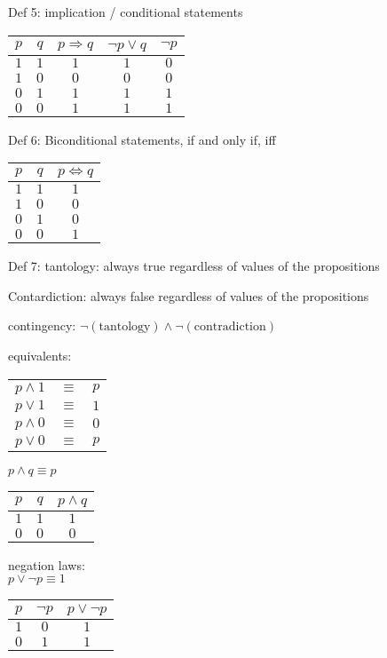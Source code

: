 \documentclass{article}
\begin{document}
Def 5: implication / conditional statements \\
\begin{tabular}{cc|c||c||c}
  $p$ & $q$ & $p \Rightarrow q$ & $\neg p \vee q$ & $\neg p$ \\ \hline
  $1$ & $1$ & $1$ & $1$ & $0$ \\
  $1$ & $0$ & $0$ & $0$ & $0$ \\
  $0$ & $1$ & $1$ & $1$ & $1$ \\
  $0$ & $0$ & $1$ & $1$ & $1$
\end{tabular}

Def 6: Biconditional statements, if and only if, iff\\
\begin{tabular}{cc|c}
  $p$ & $q$ & $p \Leftrightarrow q$ \\ \hline
  $1$ & $1$ & $1$ \\
  $1$ & $0$ & $0$ \\
  $0$ & $1$ & $0$ \\
  $0$ & $0$ & $1$
\end{tabular}

Def 7:
tantology: always true regardless of values of the propositions

Contardiction: always false regardless of values of the propositions

contingency: $\neg \left(\text{tantology}\right) \wedge \neg \left(\text{contradiction}\right)$

equivalents:\\
\begin{tabular}{ccc}
  $p \wedge 1$ & $\equiv$ & $p$ \\
  $p \vee 1$ & $\equiv$ & $1$ \\
  $p \wedge 0$ & $\equiv$ & $0$ \\
  $p \vee 0$ & $\equiv$ & $p$
\end{tabular}

$p \wedge q \equiv p$\\
\begin{tabular}{cc|c}
  $p$ & $q$ & $p \wedge q$ \\ \hline
  $1$ & $1$ & $1$ \\
  $0$ & $0$ & $0$ \\
\end{tabular}

negation laws:\\
$p \vee \neg p \equiv 1$ \\
\begin{tabular}{cc|c}
  $p$ & $\neg p$ & $p \vee \neg p$ \\ \hline
  $1$ & $0$ & $1$ \\
  $0$ & $1$ & $1$ \\
\end{tabular}
\end{document}
